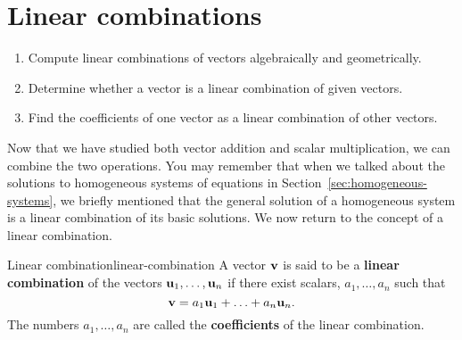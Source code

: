 \section{Linear combinations}
\label{sec:linear-combinations-rn}

\begin{outcome}
  \begin{enumerate}
  \item Compute linear combinations of vectors algebraically and
    geometrically.
  \item Determine whether a vector is a linear combination of given
    vectors.
  \item Find the coefficients of one vector as a linear combination of
    other vectors.
  \end{enumerate}
\end{outcome}


Now that we have studied both vector addition and scalar
multiplication, we can combine the two operations. You may remember
that when we talked about the solutions to homogeneous systems of
equations in Section~\ref{sec:homogeneous-systems}, we briefly
mentioned that the general solution of a homogeneous system is a
linear combination of its basic solutions. We now return to the
concept of a linear combination.

\begin{definition}{Linear combination}{linear-combination}
  A vector $\mbox{\bf v}$ is said to be a \textbf{linear
    combination} of the vectors
  $\mbox{\bf u}_1,\ldots, \mbox{\bf u}_n $ if there exist scalars,
  $a_{1},\ldots,a_{n}$ such that
  \begin{equation*}
    \mbox{\bf v} = a_1 \mbox{\bf u}_1 + \ldots + a_n \mbox{\bf u}_n.
  \end{equation*}
  The numbers $a_1,\ldots,a_n$ are called the
  \textbf{coefficients}
  of the linear combination.
\end{definition}

